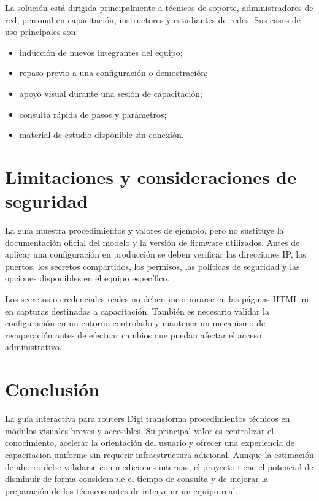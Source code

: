 \documentclass[12pt,letterpaper]{article}
\begin{document}
La solución está dirigida principalmente a técnicos de soporte, administradores de
red, personal en capacitación, instructores y estudiantes de redes. Sus casos de uso
principales son:

\begin{itemize}[leftmargin=*]
    \item inducción de nuevos integrantes del equipo;
    \item repaso previo a una configuración o demostración;
    \item apoyo visual durante una sesión de capacitación;
    \item consulta rápida de pasos y parámetros;
    \item material de estudio disponible sin conexión.
\end{itemize}

\section{Limitaciones y consideraciones de seguridad}

La guía muestra procedimientos y valores de ejemplo, pero no sustituye la
documentación oficial del modelo y la versión de firmware utilizados. Antes de
aplicar una configuración en producción se deben verificar las direcciones IP, los
puertos, los secretos compartidos, los permisos, las políticas de seguridad y las
opciones disponibles en el equipo específico.

Los secretos o credenciales reales no deben incorporarse en las páginas HTML ni en
capturas destinadas a capacitación. También es necesario validar la configuración
en un entorno controlado y mantener un mecanismo de recuperación antes de efectuar
cambios que puedan afectar el acceso administrativo.

\section{Conclusión}

La guía interactiva para routers Digi transforma procedimientos técnicos en módulos
visuales breves y accesibles. Su principal valor es centralizar el conocimiento,
acelerar la orientación del usuario y ofrecer una experiencia de capacitación
uniforme sin requerir infraestructura adicional. Aunque la estimación de ahorro debe
validarse con mediciones internas, el proyecto tiene el potencial de disminuir de
forma considerable el tiempo de consulta y de mejorar la preparación de los
técnicos antes de intervenir un equipo real.
\end{document}
